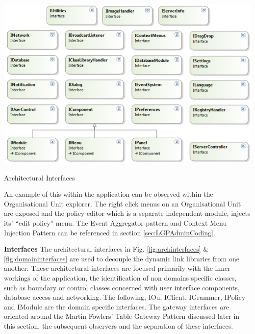 		\vspace{3mm}
		\noindent\begin{minipage}{\textwidth}
			
			\begin{figurehere}
				\centering
				\includegraphics[scale=0.85]{pages/chapter3/figures/factory-interfaces-med.png}
				\caption{Architectural Interfaces}
				\label{fig:archinterfaces}
			\end{figurehere}
		
		\end{minipage}
		
		\vspace{3mm}
		\normalsize
		{
			An example of this within the application can be observed within the Organisational Unit explorer.  The right click menus on an Organisational
			Unit are exposed and the policy editor which is a separate independent module, injects its' ``edit policy'' menu.  The Event Aggregator pattern
			and Context Menu Injection Pattern can be referenced in section \ref{sec:LGPAdminCoding}.
			\newline
		}
							
		\large{\bfseries{Interfaces}}
		\newline		
		\normalsize
		{
			The architectural interfaces in Fig. \ref{fig:archinterfaces} \& \ref{fig:domaininterfaces} are used to decouple the dynamic link libraries from one another.
			These architectural interfaces are focused primarily with the inner workings of the application, the identification of 
			non domains specific classes, such as boundary or control classes concerned with user interface components, database access and networking.  
			\newline
			\newline			
			The following,  IOu, IClient, IGrammer, IPolicy and IModule are the domain specific interfaces.  The gateway interfaces are oriented around the
			Martin Fowlers' Table Gateway Pattern discussed later in this section, the subsequent observers and the separation of these interfaces.			
		}
			
